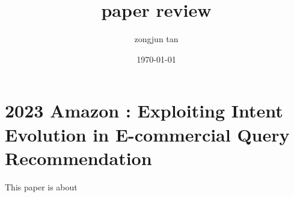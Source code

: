 \documentclass{article}
\title{paper review}
\author{zongjun tan}
\date{\today}
\begin{document}
	\maketitle
	\tableofcontents
	
\section{2023 Amazon : Exploiting Intent Evolution in E-commercial Query Recommendation}

This paper is about


\end{document}
